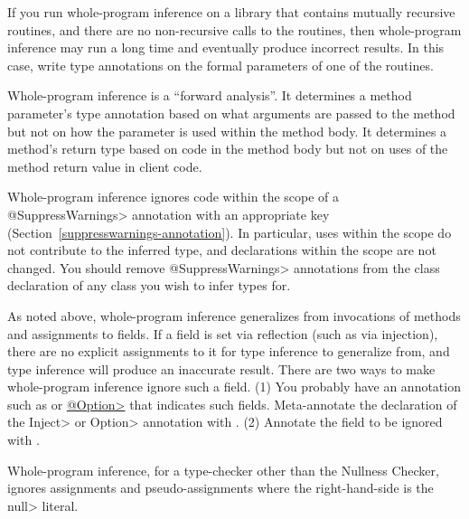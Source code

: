 If you run whole-program inference on a library that contains mutually
recursive routines, and there are no non-recursive calls to the routines,
then whole-program inference may run a long time and eventually produce
incorrect results.  In this case, write type annotations on the formal
parameters of one of the routines.

Whole-program inference is a ``forward analysis''.
It determines a method parameter's type
annotation based on what arguments are passed to the method but not on how the
parameter is used within the method body.
It determines a method's return type based on code in the method body but
not on uses of the method return value in client code.



Whole-program inference ignores code within the scope of a
\<@SuppressWarnings> annotation with an appropriate key
(Section~\ref{suppresswarnings-annotation}).  In particular, uses within
the scope do not contribute to the inferred type, and declarations within
the scope are not changed.  You should remove \<@SuppressWarnings> annotations
from the class declaration of any class you wish to infer types for.

As noted above, whole-program inference generalizes from invocations of methods and
assignments to fields.  If a field is set via
reflection (such as via injection), there are no explicit assignments to it
for type inference to generalize from, and type inference will produce
an inaccurate result.  There are two ways to make whole-program inference
ignore such a field.
%
(1)
You probably have an annotation such as
or
\href{https://types.cs.washington.edu/plume-lib/api/plume/Option.html}{\<@Option>}
that indicates such fields.  Meta-annotate the declaration of the \<Inject>
or \<Option> annotation with
.
%
(2)
Annotate the field to be ignored with
.

Whole-program inference, for a type-checker other than the Nullness Checker,
ignores assignments and pseudo-assignments where the right-hand-side is the \<null> literal.




